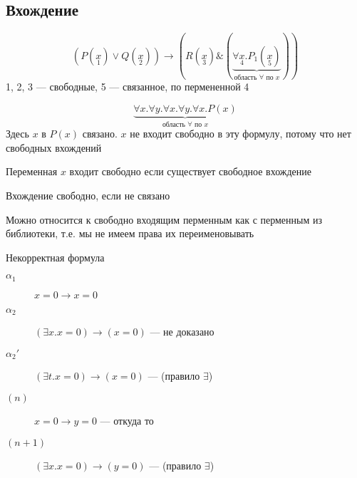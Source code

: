 \documentclass[oneside]{book}
\begin{document}
\subsection{Вхождение}
\label{sec:orga2b1766}
\begin{examp}
	\[ (P(\underset{1}{x}) \vee Q(\underset{2}{x})) \to (R(\underset{3}{x}) \& (\underbrace{\forall \underset{4}{x}. P_1(\underset{5}{x})}_{\text{область }\forall\text{ по }x})) \]
	1, 2, 3 --- свободные, 5 --- связанное, по пермененной 4
\end{examp}
\begin{examp}
	\[ \underbrace{\forall x. \forall y. \forall x. \forall y. \forall x. P(x)}_{\text{область }\forall\text{ по }x} \]
	Здесь \(x\) в \(P(x)\) связано. \(x\) не входит свободно в эту формулу, потому что нет свободных вхождений
\end{examp}
\begin{definition}
	Переменная \(x\) входит свободно если существует свободное вхождение
\end{definition}
\begin{definition}
	Вхождение свободно, если не связано
\end{definition}
Можно относится к свободно входящим перменным как с перменным из библиотеки, т.е. мы не имеем права их переименовывать
\begin{examp}
	Некорректная формула
	\begin{description}
		\item[{\(\alpha_1\)}] \(x = 0 \to x = 0\)
		\item[{\(\alpha_2\)}] \color{red}\((\exists x. x = 0) \to (x = 0)\) --- не доказано\color{black}
		\item[{\(\alpha_2'\)}] \((\exists t. x = 0) \to (x = 0)\) --- (правило \(\exists\))
	\end{description}
\end{examp}
\begin{examp}
	\-
	\begin{description}
		\item[{\((n)\)}] \(x = 0 \to y = 0\) --- откуда то
		\item[{\((n + 1)\)}] \((\exists x. x = 0) \to (y = 0)\) --- (правило \(\exists\))
	\end{description}
\end{examp}
\end{document}

